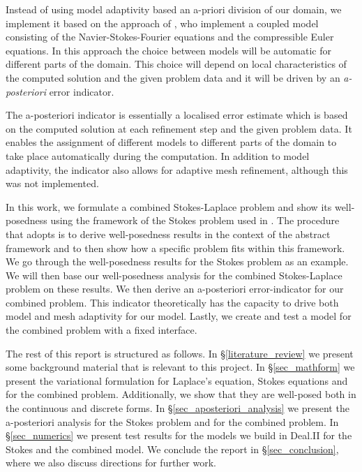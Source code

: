 \documentclass[12pt,a4paper]{article}
\theoremstyle{definition}
\begin{document}
Instead of using model adaptivity based an a-priori division of our domain, we implement it based on the approach of \cite{giesselmann2017posteriori}, who implement a coupled model consisting of the Navier-Stokes-Fourier equations and the compressible Euler equations.   In this approach  the choice between models will be automatic for different parts of the domain.  This choice will depend on local characteristics of the computed solution and the given problem data and it will be driven by an \emph{a-posteriori} error indicator.  

The a-posteriori indicator is essentially a localised error estimate which is based on the computed solution at each refinement step and the given problem data. It enables the assignment of different models to different parts of the domain to take place automatically during the computation.  In addition to model adaptivity, the indicator also allows for adaptive mesh refinement, although this was not implemented.  

In this work, we formulate a combined Stokes-Laplace problem and show its well-posedness using the framework of the Stokes problem used in \cite{verfurth2013posteriori}.  The procedure that \cite{verfurth2013posteriori} adopts is to derive well-posedness results in the context of the abstract framework and to then show how a specific problem fits within this framework.  We go through the well-posedness results for the Stokes problem as an example.  We will then base our well-posedness analysis for the combined Stokes-Laplace problem on these results.  We then derive an a-posteriori error-indicator for our combined problem.   This indicator theoretically has the capacity to drive both model and mesh adaptivity for our model.  Lastly, we create and test a model for the combined problem with a fixed interface.


The rest of this report is structured as follows.  In \S \ref{literature_review} we present some background material that is relevant to this project. In \S \ref{sec_mathform} we present the variational formulation for Laplace's equation, Stokes equations and for the combined problem.  Additionally, we show that they are well-posed both in the continuous and discrete forms.  In \S \ref{sec_aposteriori_analysis} we  present the a-posteriori analysis for the Stokes problem and for the combined problem. In \S \ref{sec_numerics} we present test results for the models we build in Deal.II for the Stokes and the combined model.   We conclude the report in \S \ref{sec_conclusion}, where we also discuss directions for further work.
\end{document}
